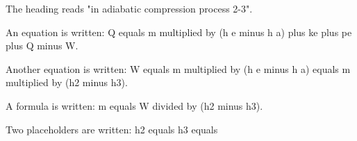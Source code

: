 The heading reads "in adiabatic compression process 2-3".  

An equation is written:  
Q equals m multiplied by (h e minus h a) plus ke plus pe plus Q minus W.  

Another equation is written:  
W equals m multiplied by (h e minus h a) equals m multiplied by (h2 minus h3).  

A formula is written:  
m equals W divided by (h2 minus h3).  

Two placeholders are written:  
h2 equals  
h3 equals